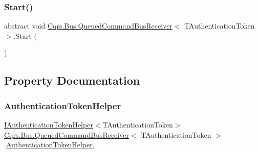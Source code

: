 \mbox{\label{classCqrs_1_1Bus_1_1QueuedCommandBusReceiver_ad8bf3c1f9d9b0444cb85784cb9e59823_ad8bf3c1f9d9b0444cb85784cb9e59823}} 
\subsubsection{\texorpdfstring{Start()}{Start()}}
{\footnotesize\ttfamily abstract void \hyperlink{classCqrs_1_1Bus_1_1QueuedCommandBusReceiver}{Cqrs.\+Bus.\+Queued\+Command\+Bus\+Receiver}$<$ T\+Authentication\+Token $>$.Start (\begin{DoxyParamCaption}{ }\end{DoxyParamCaption})\hspace{0.3cm}{\ttfamily [pure virtual]}}



\subsection{Property Documentation}
\mbox{\label{classCqrs_1_1Bus_1_1QueuedCommandBusReceiver_a809cb92ece6c52bbbe3abc347be0470d_a809cb92ece6c52bbbe3abc347be0470d}} 
\subsubsection{\texorpdfstring{Authentication\+Token\+Helper}{AuthenticationTokenHelper}}
{\footnotesize\ttfamily \hyperlink{interfaceCqrs_1_1Authentication_1_1IAuthenticationTokenHelper}{I\+Authentication\+Token\+Helper}$<$T\+Authentication\+Token$>$ \hyperlink{classCqrs_1_1Bus_1_1QueuedCommandBusReceiver}{Cqrs.\+Bus.\+Queued\+Command\+Bus\+Receiver}$<$ T\+Authentication\+Token $>$.\hyperlink{classCqrs_1_1Authentication_1_1AuthenticationTokenHelper}{Authentication\+Token\+Helper}\hspace{0.3cm}{\ttfamily [get]}, {\ttfamily [protected]}}


